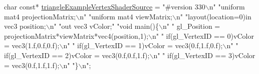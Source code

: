 \begin{DoxyCodeInclude}
\textcolor{keywordtype}{char} \textcolor{keyword}{const}* \hyperlink{triangleExample_8c_a90e98a213f90e03bd807c2f64031a8e2}{triangleExampleVertexShaderSource} = 
\textcolor{stringliteral}{"#version 330\(\backslash\)n"}
\textcolor{stringliteral}{"uniform mat4 projectionMatrix;\(\backslash\)n"}
\textcolor{stringliteral}{"uniform mat4 viewMatrix;\(\backslash\)n"}
\textcolor{stringliteral}{"layout(location=0)in vec3 position;\(\backslash\)n"}
\textcolor{stringliteral}{"out vec3 vColor;"}
\textcolor{stringliteral}{"void main()\{\(\backslash\)n"}
\textcolor{stringliteral}{"  gl\_Position = projectionMatrix*viewMatrix*vec4(position,1);\(\backslash\)n"}
\textcolor{stringliteral}{"  if(gl\_VertexID == 0)vColor = vec3(1.f,0.f,0.f);\(\backslash\)n"}
\textcolor{stringliteral}{"  if(gl\_VertexID == 1)vColor = vec3(0.f,1.f,0.f);\(\backslash\)n"}
\textcolor{stringliteral}{"  if(gl\_VertexID == 2)vColor = vec3(0.f,0.f,1.f);\(\backslash\)n"}
\textcolor{stringliteral}{"  if(gl\_VertexID == 3)vColor = vec3(0.f,1.f,1.f);\(\backslash\)n"}
\textcolor{stringliteral}{"\}\(\backslash\)n"};
\end{DoxyCodeInclude}

